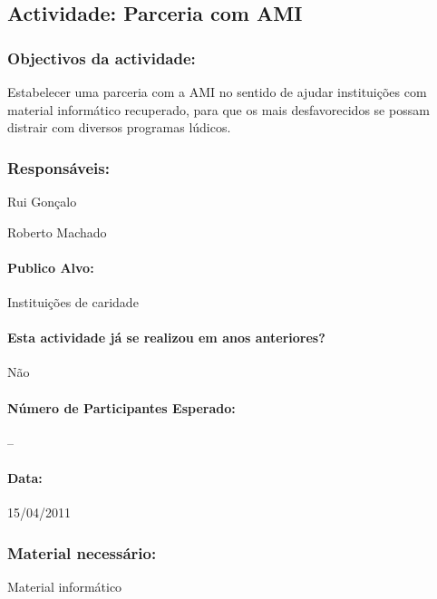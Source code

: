 \subsection{Actividade: Parceria com AMI} %

\subsubsection*{Objectivos da actividade:}
Estabelecer uma parceria com a AMI no sentido de ajudar instituições com material informático recuperado, para que os mais desfavorecidos se possam distrair com diversos programas lúdicos.

\subsubsection*{Responsáveis:}
\begin{itemizedash}
	\item{Rui Gonçalo}
	\item{Roberto Machado}
\end{itemizedash}

\paragraph{Publico Alvo: }
Instituições de caridade

\paragraph{Esta actividade já se realizou em anos anteriores?}
Não

\paragraph{Número de Participantes Esperado:}
--

\paragraph{Data:} 15/04/2011

\subsubsection*{Material necessário:}
\begin{itemizedash}
	\item{Material informático}
\end{itemizedash}

